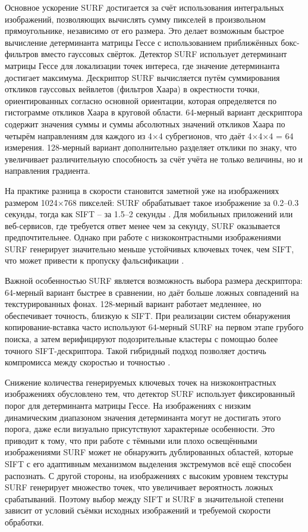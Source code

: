 Основное ускорение SURF достигается за счёт использования интегральных изображений, позволяющих вычислять сумму пикселей в произвольном прямоугольнике, независимо от его размера. Это делает возможным быстрое вычисление детерминанта матрицы Гессе с использованием приближённых бокс-фильтров вместо гауссовых свёрток. Детектор SURF использует детерминант матрицы Гессе для локализации точек интереса, где значение детерминанта достигает максимума. Дескриптор SURF вычисляется путём суммирования откликов гауссовых вейвлетов (фильтров Хаара) в окрестности точки, ориентированных согласно основной ориентации, которая определяется по гистограмме откликов Хаара в круговой области. 64-мерный вариант дескриптора содержит значения суммы и суммы абсолютных значений откликов Хаара по четырём направлениям для каждого из 4×4 субрегионов, что даёт 4×4×4 = 64 измерения. 128-мерный вариант дополнительно разделяет отклики по знаку, что увеличивает различительную способность за счёт учёта не только величины, но и направления градиента.

На практике разница в скорости становится заметной уже на изображениях размером 1024×768 пикселей: SURF обрабатывает такое изображение за 0.2–0.3 секунды, тогда как SIFT – за 1.5–2 секунды \cite{18}. Для мобильных приложений или веб-сервисов, где требуется ответ менее чем за секунду, SURF оказывается предпочтительнее. Однако при работе с низкоконтрастными изображениями SURF генерирует значительно меньше устойчивых ключевых точек, чем SIFT, что может привести к пропуску фальсификации \cite{11111}. 

Важной особенностью SURF является возможность выбора размера дескриптора: 64-мерный вариант быстрее в сравнении, но даёт больше ложных совпадений на текстурированных фонах. 128-мерный вариант работает медленнее, но обеспечивает точность, близкую к SIFT. При реализации систем обнаружения копирование-вставка часто используют 64-мерный SURF на первом этапе грубого поиска, а затем верифицируют подозрительные кластеры с помощью более точного SIFT-дескриптора. Такой гибридный подход позволяет достичь компромисса между скоростью и точностью \cite{19}. 

Снижение количества генерируемых ключевых точек на низкоконтрастных изображениях обусловлено тем, что детектор SURF использует фиксированный порог для детерминанта матрицы Гессе. На изображениях с низким динамическим диапазоном значения детерминанта могут не достигать этого порога, даже если визуально присутствуют характерные особенности. Это приводит к тому, что при работе с тёмными или плохо освещёнными изображениями SURF может не обнаружить дублированных областей, которые SIFT с его адаптивным механизмом выделения экстремумов всё ещё способен распознать. С другой стороны, на изображениях с высоким уровнем текстуры SURF генерирует множество точек, что увеличивает вероятность ложных срабатываний. Поэтому выбор между SIFT и SURF в значительной степени зависит от условий съёмки исходных изображений и требуемой скорости обработки.

